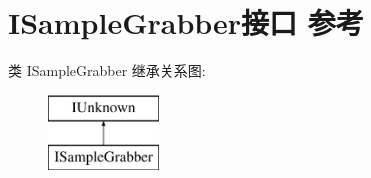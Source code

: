 \hypertarget{interface_i_sample_grabber}{}\section{I\+Sample\+Grabber接口 参考}
\label{interface_i_sample_grabber}
类 I\+Sample\+Grabber 继承关系图\+:\begin{figure}[H]
\begin{center}
\leavevmode
\includegraphics[height=2.000000cm]{interface_i_sample_grabber}
\end{center}
\end{figure}
